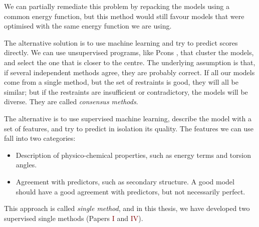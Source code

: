 We can partially remediate this problem by repacking the models using a common energy function, but this method would still favour models that were optimised with the same energy function we are using.


The alternative solution is to use machine learning and try to predict scores directly.
We can use unsupervised programs, like Pcons \citep{pcons}, that cluster the models, and select the one that is closer to the centre.
The underlying assumption is that, if several independent methods agree, they are probably correct.
If all our models come from a single method, but the set of restraints is good, they will all be similar; but if the restraints are insufficient or contradictory, the models will be diverse.
They are called \emph{consensus methods}.

The alternative is to use supervised machine learning,
describe the model with a set of features, and try to predict in isolation its quality.
The features we can use fall into two categories:

\begin{itemize}
\item Description of physico-chemical properties, such as energy terms and torsion angles.
\item Agreement with predictors, such as secondary structure. A good model should have a good agreement with predictors, but not necessarily perfect.
\end{itemize}

This approach is called \emph{single method}, and in this thesis, we have developed two supervised single methods (Papers \textcolor{Maroon}{I} and \textcolor{Maroon}{IV}).

